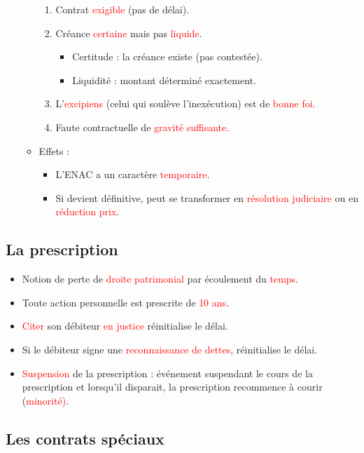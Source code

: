 \begin{enumerate}
\begin{itemize}
\begin{enumerate}
			\item Contrat \textcolor{red}{exigible} (pas de délai).
			\item Créance \textcolor{red}{certaine} mais pas \textcolor{red}{liquide}.
			\begin{itemize}
				\item Certitude : la créance existe (pas contestée).
				\item Liquidité : montant déterminé exactement.
			\end{itemize}
			\item L'\textcolor{red}{excipiens} (celui qui soulève l'inexécution) est de \textcolor{red}{bonne foi}.
			\item Faute contractuelle de \textcolor{red}{gravité suffisante}.
		\end{enumerate}
		\item Effets :
		\begin{itemize}
			\item L'ENAC a un caractère \textcolor{red}{temporaire}.
			\item Si devient définitive, peut se transformer en \textcolor{red}{résolution judiciaire} ou en \textcolor{red}{réduction prix}.
		\end{itemize}
	\end{itemize}
\end{enumerate}

\subsection{La prescription}

\begin{itemize}
	\item Notion de perte de \textcolor{red}{droite patrimonial} par écoulement du \textcolor{red}{temps}.
	\item Toute action personnelle est prescrite de \textcolor{red}{10 ans}.
	\item \textcolor{red}{Citer} son débiteur \textcolor{red}{en justice} réinitialise le délai.
	\item Si le débiteur signe une \textcolor{red}{reconnaissance de dettes}, réinitialise le délai.
	\item \textcolor{red}{Suspension} de la prescription : événement suspendant le cours de la prescription et lorsqu'il disparait, la prescription recommence à courir (\textcolor{red}{minorité)}.
\end{itemize}

\subsection{Les contrats spéciaux}

